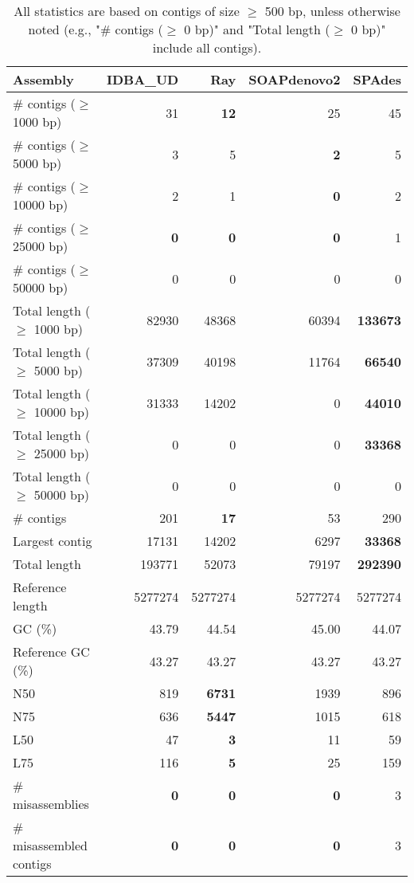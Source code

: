 \documentclass[12pt,a4paper]{article}
\begin{document}
\begin{table}[ht]
\begin{center}
\caption{All statistics are based on contigs of size $\geq$ 500 bp, unless otherwise noted (e.g., "\# contigs ($\geq$ 0 bp)" and "Total length ($\geq$ 0 bp)" include all contigs).}
\begin{tabular}{|l*{4}{|r}|}
\hline
Assembly & IDBA\_UD & Ray & SOAPdenovo2 & SPAdes \\ \hline
\# contigs ($\geq$ 1000 bp) & 31 & {\bf 12} & 25 & 45 \\ \hline
\# contigs ($\geq$ 5000 bp) & 3 & 5 & {\bf 2} & 5 \\ \hline
\# contigs ($\geq$ 10000 bp) & 2 & 1 & {\bf 0} & 2 \\ \hline
\# contigs ($\geq$ 25000 bp) & {\bf 0} & {\bf 0} & {\bf 0} & 1 \\ \hline
\# contigs ($\geq$ 50000 bp) & 0 & 0 & 0 & 0 \\ \hline
Total length ($\geq$ 1000 bp) & 82930 & 48368 & 60394 & {\bf 133673} \\ \hline
Total length ($\geq$ 5000 bp) & 37309 & 40198 & 11764 & {\bf 66540} \\ \hline
Total length ($\geq$ 10000 bp) & 31333 & 14202 & 0 & {\bf 44010} \\ \hline
Total length ($\geq$ 25000 bp) & 0 & 0 & 0 & {\bf 33368} \\ \hline
Total length ($\geq$ 50000 bp) & 0 & 0 & 0 & 0 \\ \hline
\# contigs & 201 & {\bf 17} & 53 & 290 \\ \hline
Largest contig & 17131 & 14202 & 6297 & {\bf 33368} \\ \hline
Total length & 193771 & 52073 & 79197 & {\bf 292390} \\ \hline
Reference length & 5277274 & 5277274 & 5277274 & 5277274 \\ \hline
GC (\%) & 43.79 & 44.54 & 45.00 & 44.07 \\ \hline
Reference GC (\%) & 43.27 & 43.27 & 43.27 & 43.27 \\ \hline
N50 & 819 & {\bf 6731} & 1939 & 896 \\ \hline
N75 & 636 & {\bf 5447} & 1015 & 618 \\ \hline
L50 & 47 & {\bf 3} & 11 & 59 \\ \hline
L75 & 116 & {\bf 5} & 25 & 159 \\ \hline
\# misassemblies & {\bf 0} & {\bf 0} & {\bf 0} & 3 \\ \hline
\# misassembled contigs & {\bf 0} & {\bf 0} & {\bf 0} & 3 \\ \hline

\end{tabular}
\end{center}
\end{table}
\end{document}
